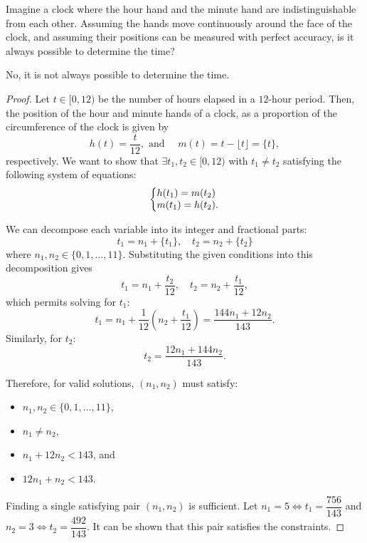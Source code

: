 \begin{problem}
  Imagine a clock where the hour hand and the minute hand are indistinguishable
  from each other. Assuming the hands move continuously around the face of the
  clock, and assuming their positions can be measured with perfect accuracy, is
  it always possible to determine the time?

  \vspace{\baselineskip}

  No, it is not always possible to determine the time.

  \begin{proof}
    Let $t \in [0, 12)$ be the number of hours elapsed in a $12$-hour period.
    Then, the position of the hour and minute hands of a clock, as a proportion 
    of the circumference of the clock is given by
    \[
      h(t) = \frac{t}{12}, \text{ and } \quad m(t) = t - \lfloor t \rfloor = \{ t \},
    \]
    respectively.
    We want to show that $\exists t_{1}, t_{2} \in [0, 12)$ with $t_{1} \neq t_{2}$ 
    satisfying the following system of equations: 
    \begin{equation*}
    \left\{
      \begin{array}{@{}l@{}}
        h(t_{1}) = m(t_{2})\\
        m(t_{1}) = h(t_{2}).
      \end{array}\right.
    \end{equation*}

    We can decompose each variable into its integer and fractional parts:
    \[
      t_{1} = n_{1} + \{t_{1}\}, \quad t_{2} = n_{2} + \{t_{2}\}
    \]
    where $n_{1}, n_{2} \in \{ 0, 1, \ldots, 11 \}$.
    Substituting the given conditions into this decomposition gives
    \[
      t_{1} = n_{1} + \frac{t_{2}}{12}, \quad t_{2} = n_{2} + \frac{t_{1}}{12},
    \]
    which permits solving for $t_{1}$:
    \[
      t_{1} = n_{1} + \frac{1}{12} \left( n_{2} + \frac{t_{1}}{12} \right) = \frac{144n_{1} + 12n_{2}}{143}.
    \]
    Similarly, for $t_2$:
    \[
      t_{2} = \frac{12n_{1} + 144n_{2}}{143}.
    \]

    Therefore, for valid solutions, $(n_{1}, n_{2})$ must satisfy:
    \begin{itemize}
      \item $n_1, n_2 \in \{0,1,\ldots,11\}$,
      \item $n_1 \neq n_2$,
      \item $n_1 + 12n_2 < 143$, and
      \item $12n_1 + n_2 < 143$.
    \end{itemize}
    Finding a single satisfying pair $(n_{1}, n_{2})$ is sufficient. Let $n_{1} = 5 \iff t_{1} = \dfrac{756}{143}$
    and $n_{2} = 3 \iff t_{2} = \dfrac{492}{143}$. It can be shown that this pair satisfies the constraints. 
  \end{proof}
\end{problem}
